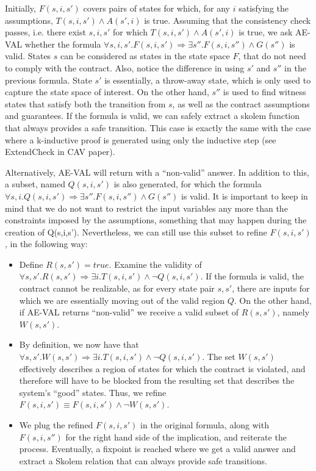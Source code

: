 \documentclass[10pt,conference]{IEEEtran}
\begin{document}
Initially, $F(s, i, s')$ covers pairs of states for which, for any $i$
satisfying the assumptions, $T(s,i,s') \land A(s',i)$ is true. Assuming that the
consistency check passes, i.e. there exist $s, i ,s'$ for which $T(s,i,s') \land
A(s',i)$ is true, we ask AE-VAL whether the formula $\forall s,i,s'. F(s,i,s') \Rightarrow \exists s''.
F(s,i,s'') \land G(s'')$ is valid. States $s$ can be considered as
states in the state space $F$, that do not need to comply with the contract.
Also, notice the difference in using $s'$ and $s''$ in the previous formula. State $s'$ is essentially, a throw-away state, which is only used to
capture the state space of interest. On the other hand, $s''$ is used to find
witness states that satisfy both the transition from $s$, as well as the
contract assumptions and guarantees. If the formula is valid, we can safely
extract a skolem function that always provides a safe transition. This case is
exactly the same with the case where a k-inductive proof is generated using only the inductive step (see ExtendCheck in CAV paper).

Alternatively, AE-VAL will return with a ``non-valid'' answer. In addition to
this, a subset, named $Q(s,i,s')$ is also generated, for which the formula
$\forall s,i. Q(s,i,s') \Rightarrow \exists s''. F(s,i,s'') \land G(s'')$ is
valid. It is important to keep in mind that we do not want to restrict the input
variables any more than the constraints imposed by the assumptions, something
that may happen during the creation of Q(s,i,s'). Nevertheless, we can still use
this subset to refine $F(s,i,s')$, in the following way:

\begin{itemize}
  \item Define $R(s,s') = true$. Examine the validity of $\forall s,s'. R(s,s')
  \Rightarrow \exists i. T(s,i,s') \land \lnot Q(s,i,s')$. If the formula is
  valid, the contract cannot be realizable, as for every state pair $s, s'$,
  there are inputs for which we are essentially moving out of the valid region
  $Q$. On the other hand, if AE-VAL returns ``non-valid'' we receive a valid
  subset of $R(s,s')$, namely $W(s,s')$.
  \item By definition, we now have that $\forall s,s'. W(s,s') \Rightarrow
  \exists i. T(s,i,s') \land \lnot Q(s,i,s')$. The set $W(s,s')$ effectively
  describes a region of states for which the contract is violated, and therefore will have to be blocked from the
  resulting set that describes the system's ``good'' states. Thus, we refine
  $F(s,i,s') \equiv F(s,i,s') \land \lnot W(s,s')$.
  \item We plug the refined $F(s,i,s')$ in the original formula, along with
  $F(s,i,s'')$ for the right hand side of the implication, and reiterate the
  process. Eventually, a fixpoint is reached where we get a valid answer and
  extract a Skolem relation that can always provide safe transitions.
\end{itemize}
\end{document}
